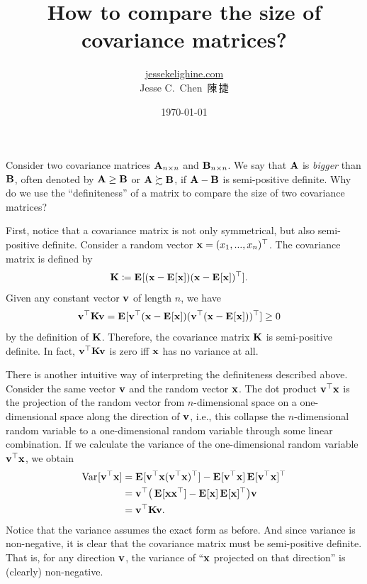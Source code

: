 \documentclass[a4paper]{article}
\title{How to compare the size of covariance matrices?}
\author{\href{https://jessekelighine.com}{jessekelighine.com}\\Jesse C.\ Chen\ 陳\,捷}
\date{\today}
\begin{document}
\maketitle

\begin{multicols}{2}

\noindent
Consider two covariance matrices $\AA_{n\times n}$ and $\BB_{n\times n}$.
We say that $\AA$ is \emph{bigger} than $\BB$,
often denoted by $\AA\geq \BB$ or $\AA\succsim \BB$, if $\AA-\BB$ is semi-positive definite.
Why do we use the ``definiteness'' of a matrix to compare the size of two covariance matrices?

First, notice that a covariance matrix is not only symmetrical, but also
semi-positive definite.  Consider a random vector $\xx=(x_1,...,x_n)\T$.
The covariance matrix is defined by
\begin{align*}
	\KK &\coloneqq \E{(\xx-\E{\xx})(\xx-\E{\xx})\T}.
\end{align*}
Given any constant vector $\vv$ of length $n$, we have
\begin{align*}
	\vv\T \KK \vv &= \E{\vv\T(\xx-\E{\xx})(\vv\T(\xx-\E{\xx}))\T} \geq 0
\end{align*}
by the definition of $\KK$.
Therefore, the covariance matrix $\KK$ is semi-positive definite.
In fact, $\vv\T\KK\vv$ is zero iff $\xx$ has no variance at all.

There is another intuitive way of interpreting the definiteness described above.
Consider the same vector $\vv$ and the random vector $\xx$.
The dot product $\vv\T \xx$ is the projection of the random vector from $n$-dimensional
space on a one-dimensional space along the direction of $\vv$, i.e.,
this collapse the $n$-dimensional random variable to a one-dimensional random variable through some linear combination.
If we calculate the variance of the one-dimensional random variable $\vv\T \xx$, we obtain
\begin{align*}
	\var{\vv\T \xx}
	&= \E{\vv\T \xx(\vv\T \xx)\T } - \E{\vv\T \xx}\E{\vv\T \xx}\T  \\
	&= \vv\T \big(\E{\xx\xx\T } - \E{\xx}\E{\xx}\T \big)\vv \\
	&= \vv\T \KK\vv.
\end{align*}
Notice that the variance assumes the exact form as before.
And since variance is non-negative, it is clear that the covariance matrix must be semi-positive definite.
That is, for any direction $\vv$,
the variance of ``$\xx$ projected on that direction'' is (clearly) non-negative.


\end{multicols}
\end{document}
